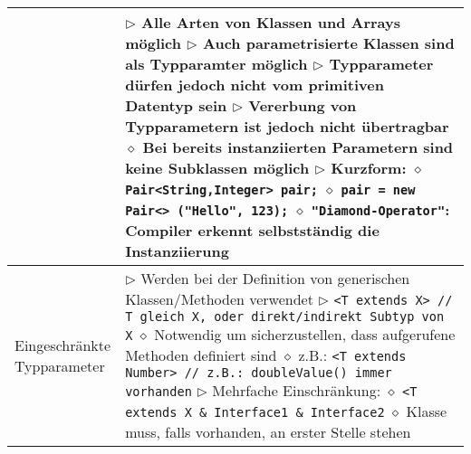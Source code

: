 \begin{longtable}{ | p{} p{} | }
	\makecell[l]{Typparameter} & \makecell[l]{
	$\triangleright$ Alle Arten von Klassen und Arrays möglich \\
	$\triangleright$ Auch parametrisierte Klassen sind als Typparamter möglich \\
	$\triangleright$ Typparameter dürfen jedoch nicht vom primitiven Datentyp sein \\
	$\triangleright$ Vererbung von Typparametern ist jedoch nicht übertragbar \\ 
	\hspace{0.4cm} $\diamond$ Bei bereits instanziierten Parametern sind keine Subklassen möglich \\
	$\triangleright$ Kurzform: \\
	\hspace{0.4cm} $\diamond$ \texttt{Pair<String,Integer> pair;} \\
	\hspace{0.4cm} $\diamond$ \texttt{pair = new Pair<> ("Hello", 123);} \\
	\hspace{0.4cm} $\diamond$ \texttt{"Diamond-Operator"}: Compiler erkennt selbstständig die Instanziierung } \\ \hline

	\makecell[l]{Eingeschränkte \\ Typparameter} & \makecell[l]{
	$\triangleright$ Werden bei der Definition von generischen Klassen/Methoden verwendet \\
	$\triangleright$ \texttt{<T extends X> // T gleich X, oder direkt/indirekt Subtyp von X} \\
	\hspace{0.4cm} $\diamond$ Notwendig um sicherzustellen, dass aufgerufene Methoden definiert sind \\
	\hspace{0.4cm} $\diamond$ z.B.: \texttt{<T extends Number> // z.B.: doubleValue() immer vorhanden} \\
	$\triangleright$ Mehrfache Einschränkung:  \\
	\hspace{0.4cm} $\diamond$ \texttt{<T extends X \& Interface1 \& Interface2} \\
	\hspace{0.4cm} $\diamond$ Klasse muss, falls vorhanden, an erster Stelle stehen} \\ \hline


\end{longtable}
